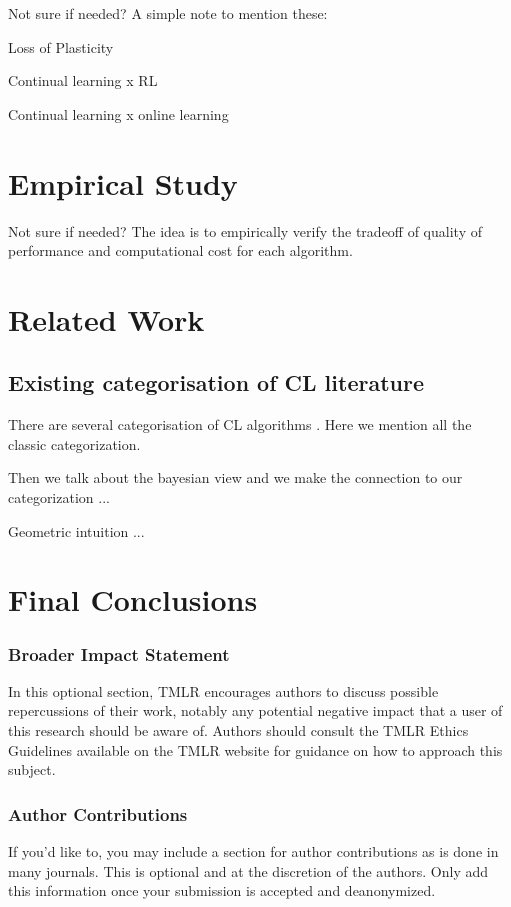 \documentclass[10pt]{article} %
\begin{document}
Not sure if needed? A simple note to mention these:

Loss of Plasticity

Continual learning x RL 

Continual learning x online learning 



\section{Empirical Study}
Not sure if needed? The idea is to empirically verify the tradeoff of quality of performance and computational cost for each algorithm. 

\section{Related Work}
\subsection{Existing categorisation of CL literature}

There are several categorisation of CL algorithms . Here we mention all the classic categorization. 

Then we talk about the bayesian view and we make the connection to our categorization ...
\citet{farquhar_unifying_2019}

Geometric intuition ...

\section{Final Conclusions}

\subsubsection*{Broader Impact Statement}
In this optional section, TMLR encourages authors to discuss possible repercussions of their work,
notably any potential negative impact that a user of this research should be aware of. 
Authors should consult the TMLR Ethics Guidelines available on the TMLR website
for guidance on how to approach this subject.

\subsubsection*{Author Contributions}
If you'd like to, you may include a section for author contributions as is done
in many journals. This is optional and at the discretion of the authors. Only add
this information once your submission is accepted and deanonymized. 
\end{document}
